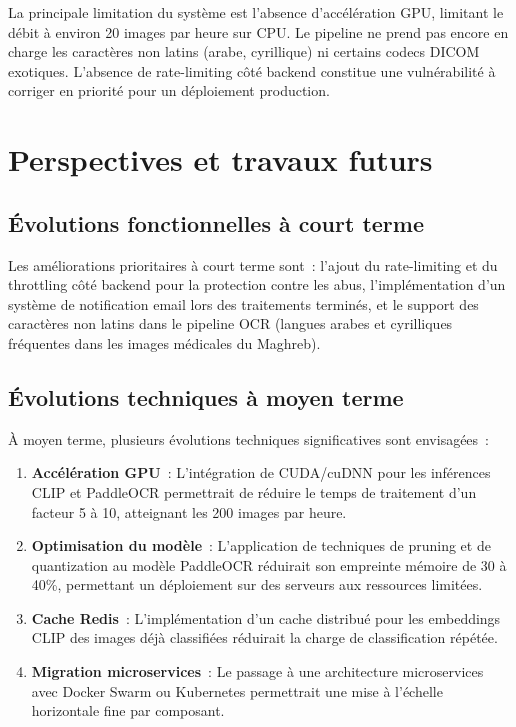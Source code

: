 La principale limitation du système est l'absence d'accélération GPU, limitant le débit à environ 20 images par heure sur CPU. Le pipeline ne prend pas encore en charge les caractères non latins (arabe, cyrillique) ni certains codecs DICOM exotiques. L'absence de rate-limiting côté backend constitue une vulnérabilité à corriger en priorité pour un déploiement production.

\section*{Perspectives et travaux futurs}

\subsection*{Évolutions fonctionnelles à court terme}

Les améliorations prioritaires à court terme sont~: l'ajout du rate-limiting et du throttling côté backend pour la protection contre les abus, l'implémentation d'un système de notification email lors des traitements terminés, et le support des caractères non latins dans le pipeline OCR (langues arabes et cyrilliques fréquentes dans les images médicales du Maghreb).

\subsection*{Évolutions techniques à moyen terme}

À moyen terme, plusieurs évolutions techniques significatives sont envisagées~:
\begin{enumerate}
  \item \textbf{Accélération GPU}~: L'intégration de CUDA/cuDNN pour les inférences CLIP et PaddleOCR permettrait de réduire le temps de traitement d'un facteur 5 à 10, atteignant les 200 images par heure.
  \item \textbf{Optimisation du modèle}~: L'application de techniques de pruning et de quantization au modèle PaddleOCR réduirait son empreinte mémoire de 30 à 40\%, permettant un déploiement sur des serveurs aux ressources limitées.
  \item \textbf{Cache Redis}~: L'implémentation d'un cache distribué pour les embeddings CLIP des images déjà classifiées réduirait la charge de classification répétée.
  \item \textbf{Migration microservices}~: Le passage à une architecture microservices avec Docker Swarm ou Kubernetes permettrait une mise à l'échelle horizontale fine par composant.
\end{enumerate}

